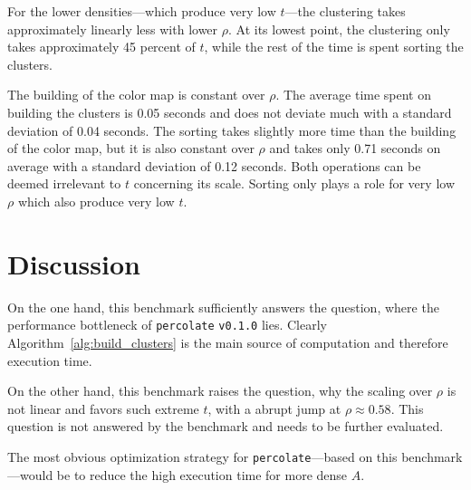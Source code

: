 \documentclass[twoside,11pt]{article}
\def\perc{\texttt{perco\-late}}
\def\v{\texttt{v0.1.0}}
\begin{document}
For the lower densities---which produce very low
$t$---the clustering takes approximately linearly less with
lower $\rho$.
At its lowest point, the clustering only takes
approximately 45 percent of $t$, while the rest of the time
is spent sorting the clusters.

The building of the color map is constant over $\rho$.
The average time spent on building the clusters is 0.05
seconds and does not deviate much with a standard deviation
of 0.04 seconds.
The sorting takes slightly more time than the building of
the color map, but it is also constant over $\rho$ and
takes only 0.71 seconds on average with a standard
deviation of 0.12 seconds.
Both operations can be deemed irrelevant to $t$ concerning
its scale.
Sorting only plays a role for very low $\rho$ which also
produce very low $t$.


\section{Discussion} %

On the one hand, this benchmark sufficiently answers the
question, where the performance bottleneck of \perc{} \v{}
lies.
Clearly Algorithm~\ref{alg:build_clusters} is the main
source of computation and therefore execution time.

On the other hand, this benchmark raises the question, why
the scaling over $\rho$ is not linear and favors such
extreme $t$, with a abrupt jump at $\rho \approx 0.58$.
This question is not answered by the benchmark and needs to
be further evaluated.

The most obvious optimization strategy for \perc{}---based
on this benchmark---would be to reduce the high execution
time for more dense $A$.
\end{document}
